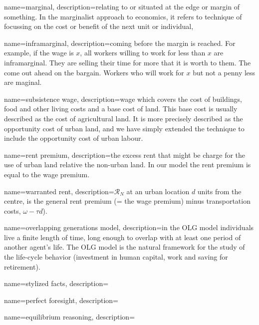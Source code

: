 

{
name=marginal,
description={relating to or situated at the edge or margin of something. In the marginalist approach to economics, it  refers to technique of focussing on the cost or benefit of the next unit or individual, }
}

{
name=inframarginal,
description={coming before the margin is reached. For example, if the wage is $x$, all workers willing to work for less than $x$ are inframarginal. They are selling their time for more that it is worth to them. The come out ahead on the bargain. Workers who will work for $x$ but not a penny less are maginal. }
}

{
name=subsistence wage,
description={wage which covers the cost of buildings, food and other living costs and a base cost of land. This base cost is usually described as the cost of agricultural land. It is more precisely described as the opportunity cost of urban land, and we have simply extended the technique to include the opportunity cost of urban labour. }
}

{
name=rent premium,
description={the excess rent  that might be charge for the use of urban land relative the non-urban land. In our model the rent premium is equal to the wage premium. }
}

{
name=warranted rent,
description={$\mathcal{R}_N$ at an  urban location  $d$ units from the centre, is the general rent premium (= the wage premium) minus transportation costs, $\omega-\tau d$).    }
}


{
name=overlapping generations model,
description={in the OLG model individuals live a finite length of time, long enough to overlap with at least one period of another agent's life. The OLG model is the natural framework for the study of the life-cycle behavior (investment in human capital, work and saving for retirement).}
}

{
name=stylized facts,
description={ }
}

{
name=perfect foresight,
description={ }
}

{
name=equilibrium reasoning,
description={}
}

